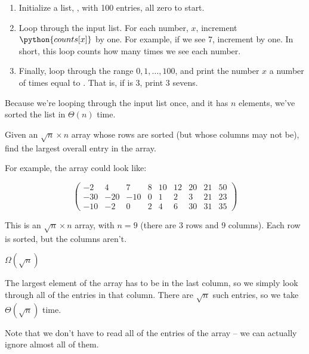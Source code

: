 \begin{prob}
\begin{subprobset}
\begin{subprob}
\begin{soln}
                \begin{enumerate}
                    \item Initialize a list, , with 100 entries, all zero to start.
                    \item Loop through the input list. For each number, $x$, increment $\python{counts[x]}$ by one. For example, if we see
                        7, increment  by one. In short, this loop counts how many times we see each number.
                    \item Finally, loop through the range $0, 1, \ldots, 100$, and print the number $x$ a number of times equal to .
                        That is, if  is 3, print 3 sevens.
                \end{enumerate}

                Because we're looping through the input list once, and it has $n$ elements, we've sorted the list in $\Theta(n)$ time.
             \end{soln}

        \end{subprob}

        \begin{subprob}
            Given an $\sqrt{n} \times n$ array whose rows are sorted (but whose columns may not be), find the largest overall entry in the array.

            For example, the array could look like:

            \[
            \begin{pmatrix}
                -2 & 4 & 7 & 8 & 10 & 12 & 20 & 21 & 50\\
                -30 & -20 & -10 & 0 & 1 & 2 & 3 & 21 & 23\\
                -10 & -2 & 0 & 2 & 4 & 6 & 30 & 31 & 35
            \end{pmatrix}
            \]

            This is an $\sqrt n \times n$ array, with $n = 9$ (there are 3 rows and 9 columns). Each row is sorted, but the columns aren't.

            \begin{soln}
                $\Omega(\sqrt n)$

                The largest element of the array has to be in the last column, so we simply look through all of the entries in that column.
                There are $\sqrt n$ such entries, so we take $\Theta(\sqrt n)$ time.

                Note that we don't have to read all of the entries of the array -- we can actually ignore almost all of them.
            \end{soln}

        \end{subprob}

    \end{subprobset}

\end{prob}
